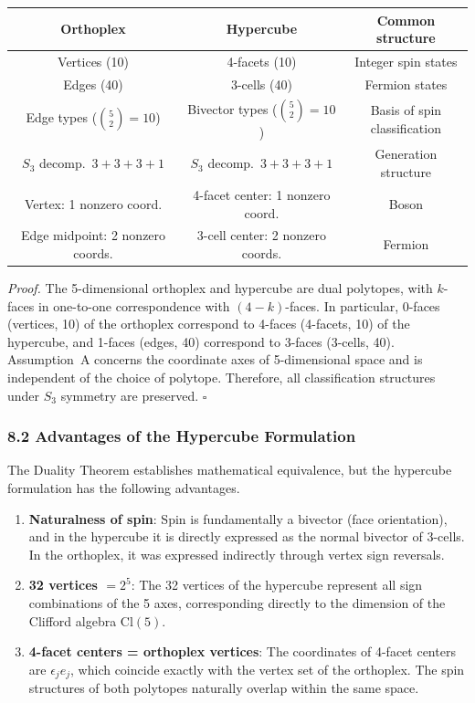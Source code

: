 \documentclass[a4paper,11pt]{article}
\providecommand{\tightlist}{\setlength{\itemsep}{0pt}\setlength{\parskip}{0pt}}
\newcounter{none}
\begin{document}
{\def\LTcaptype{none}
\begin{longtable}[]{@{}ccc@{}}
\toprule
Orthoplex & Hypercube & Common structure \\
\midrule
\endhead
\bottomrule
\endlastfoot
Vertices (10) & 4-facets (10) & Integer spin states \\
Edges (40) & 3-cells (40) & Fermion states \\
Edge types ($\binom{5}{2} = 10$) & Bivector types ($\binom{5}{2} = 10$) & Basis of spin classification \\
$S_3$ decomp.\ $3{+}3{+}3{+}1$ & $S_3$ decomp.\ $3{+}3{+}3{+}1$ & Generation structure \\
Vertex: 1 nonzero coord. & 4-facet center: 1 nonzero coord. & Boson \\
Edge midpoint: 2 nonzero coords. & 3-cell center: 2 nonzero coords. & Fermion \\
\end{longtable}
}

\emph{Proof.} The 5-dimensional orthoplex and hypercube are dual polytopes, with $k$-faces in one-to-one correspondence with $(4-k)$-faces. In particular, 0-faces (vertices, 10) of the orthoplex correspond to 4-faces (4-facets, 10) of the hypercube, and 1-faces (edges, 40) correspond to 3-faces (3-cells, 40). Assumption~A concerns the coordinate axes of 5-dimensional space and is independent of the choice of polytope. Therefore, all classification structures under $S_3$ symmetry are preserved. $\square$

\subsubsection*{8.2 Advantages of the Hypercube Formulation}

The Duality Theorem establishes mathematical equivalence, but the hypercube formulation has the following advantages.

\begin{enumerate}
\def\labelenumi{\arabic{enumi}.}
\tightlist
\item
  \textbf{Naturalness of spin}: Spin is fundamentally a bivector (face orientation), and in the hypercube it is directly expressed as the normal bivector of 3-cells. In the orthoplex, it was expressed indirectly through vertex sign reversals.
\item
  \textbf{32 vertices $= 2^5$}: The 32 vertices of the hypercube represent all sign combinations of the 5 axes, corresponding directly to the dimension of the Clifford algebra $\mathrm{Cl}(5)$.
\item
  \textbf{4-facet centers = orthoplex vertices}: The coordinates of 4-facet centers are $\epsilon_j e_j$, which coincide exactly with the vertex set of the orthoplex. The spin structures of both polytopes naturally overlap within the same space.
\end{enumerate}
\end{document}
